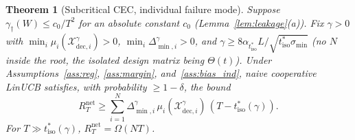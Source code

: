 \documentclass[11pt]{article}
\newtheorem{theorem}{Theorem}[section]
\begin{document}
\begin{theorem}[Subcritical CEC, individual failure mode]
\label{thm:cec_sub}
Suppose $\gamma_\dagger(W)\leq c_0/T^2$ for an absolute constant $c_0$
(Lemma~\ref{lem:leakage}(a)).
Fix $\gamma>0$ with $\min_i\mu_i(\mathcal{X}_{\mathrm{dec},i}^\gamma)>0$,
$\min_i\Delta_{\min,i}^\gamma>0$, and
$\gamma\geq 8\alpha_{t_{\mathrm{iso}}^*}L/\sqrt{t_{\mathrm{iso}}^*\sigma_{\min}}$
(no $N$ inside the root, the isolated design matrix being $\Theta(t)$).
Under Assumptions~\ref{ass:reg}, \ref{ass:margin}, and~\ref{ass:bias_ind},
naive cooperative LinUCB satisfies, with probability $\geq 1-\delta$, the bound
\begin{equation}
R_T^{\mathrm{net}}\geq\sum_{i=1}^N\Delta_{\min,i}^\gamma\,
\mu_i(\mathcal{X}_{\mathrm{dec},i}^\gamma)\,(T-t_{\mathrm{iso}}^*(\gamma)).
\label{eq:cec_sub}
\end{equation}
For $T\gg t_{\mathrm{iso}}^*(\gamma)$, $R_T^{\mathrm{net}}=\Omega(NT)$.
\end{theorem}
\end{document}
